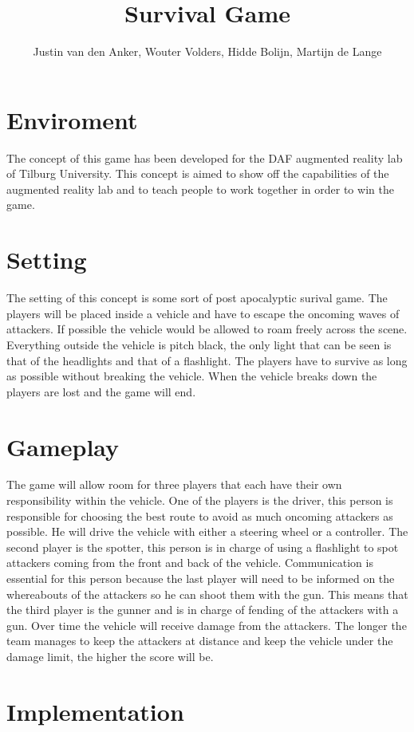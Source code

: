 \documentclass[10pt,a4paper]{article}
\author{Justin van den Anker, Wouter Volders, Hidde Bolijn, Martijn de Lange}
\title{Survival Game}
\begin{document}
\maketitle

\section{Enviroment}
The concept of this game has been developed for the DAF augmented reality lab of Tilburg University. This concept is aimed to show off the capabilities of the augmented reality lab and to teach people to work together in order to win the game. 

\section{Setting}
The setting of this concept is some sort of post apocalyptic surival game. The players will be placed inside a vehicle and have to escape the oncoming waves of attackers. If possible the vehicle would be allowed to roam freely across the scene. Everything outside the vehicle is pitch black, the only light that can be seen is that of the headlights and that of a flashlight. The players have to survive as long as possible without breaking the vehicle. When the vehicle breaks down the players are lost and the game will end.

\section{Gameplay}
The game will allow room for three players that each have their own responsibility within the vehicle. One of the players is the driver, this person is responsible for choosing the best route to avoid as much oncoming attackers as possible. He will drive the vehicle with either a steering wheel or a controller. The second player is the spotter, this person is in charge of using a flashlight to spot attackers coming from the front and back of the vehicle. Communication is essential for this person because the last player will need to be informed on the whereabouts of the attackers so he can shoot them with  the gun. This means that the third player is the gunner and is in charge of fending of the attackers with a gun. Over time the vehicle will receive damage from the attackers. The longer the team manages to keep the attackers at distance and keep the vehicle under the damage limit, the higher the score will be.

\section{Implementation}
\end{document}
